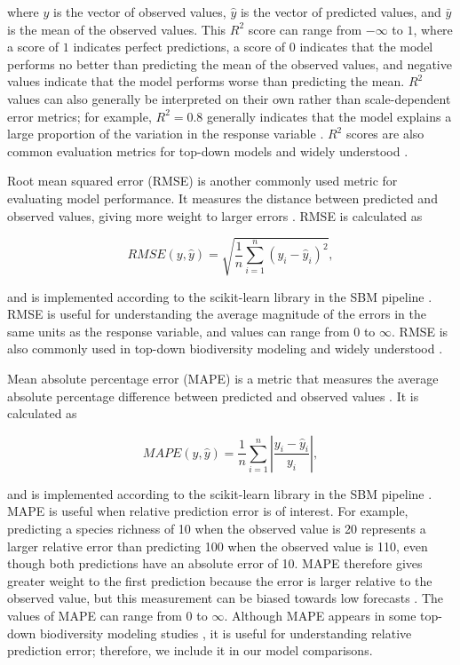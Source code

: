 where \(y\) is the vector of observed values, \(\hat{y}\) is the vector of predicted values, and \(\bar{y}\) is the mean of the observed values. This \(R^2\) score can range from \(-\infty\) to \(1\), where a score of \(1\) indicates perfect predictions, a score of \(0\) indicates that the model performs no better than predicting the mean of the observed values, and negative values indicate that the model performs worse than predicting the mean. \(R^2\) values can also generally be interpreted on their own rather than scale-dependent error metrics; for example, \(R^2=0.8\) generally indicates that the model explains a large proportion of the variation in the response variable \parencite{chicco2021}. \(R^2\) scores are also common evaluation metrics for top-down models and widely understood \parencite{olaya-marin_comparison_2013, mcnellie2021, cai2023, brugere2023, baggstrom2025}.

Root mean squared error (RMSE) is another commonly used metric for evaluating model performance. It measures the distance between predicted and observed values, giving more weight to larger errors \parencite{chicco2021}. RMSE is calculated as

\[RMSE(y,\hat{y}) = \sqrt{\frac{1}{n}\sum_{i=1}^n (y_i - \hat{y}_i)^2},\]

and is implemented according to the scikit-learn library in the SBM pipeline \parencite{scikit-learn}. RMSE is useful for understanding the average magnitude of the errors in the same units as the response variable, and values can range from \(0\) to \(\infty\). RMSE is also commonly used in top-down biodiversity modeling and widely understood \parencite{mondal2021, cai2023, baggstrom2025}.

Mean absolute percentage error (MAPE) is a metric that measures the average absolute percentage difference between predicted and observed values \parencite{chicco2021}. It is calculated as

\[MAPE(y,\hat{y}) = \frac{1}{n}\sum_{i=1}^n \left|\frac{y_i - \hat{y}_i}{y_i}\right|,\]

and is implemented according to the scikit-learn library in the SBM pipeline \parencite{scikit-learn}. MAPE is useful when relative prediction error is of interest. For example, predicting a species richness of 10 when the observed value is 20 represents a larger relative error than predicting 100 when the observed value is 110, even though both predictions have an absolute error of 10. MAPE therefore gives greater weight to the first prediction because the error is larger relative to the observed value, but this measurement can be biased towards low forecasts \parencite{chicco2021}. The values of MAPE can range from \(0\) to \(\infty\). Although MAPE appears in some top-down biodiversity modeling studies \parencite{andermann2022}, it is useful for understanding relative prediction error; therefore, we include it in our model comparisons.


